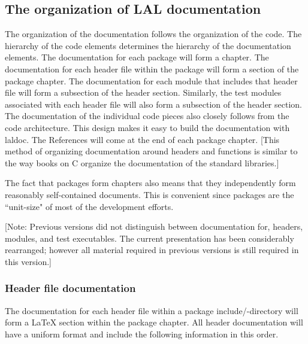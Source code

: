 \documentclass[]{ligodcc}
\begin{document}
\subsection{The organization of LAL documentation}
The organization  of  the documentation follows the organization of
the code. The hierarchy of the code elements determines the hierarchy
of the documentation elements. The documentation for each package will
form a chapter. The documentation for each  header file within the
package will form a section of the package chapter. The documentation
for each module that includes that header file will form a subsection
of the header section. Similarly, the test modules associated with
each header file will also form a subsection of the header section.
The  documentation of the individual code pieces also closely follows
from the code architecture.  This design makes it easy to build the
documentation with laldoc. The References will come at the end of each
package chapter. [This method of organizing documentation around
headers and functions is similar to  the way books on C organize the
documentation of  the standard libraries.]

The fact that packages form chapters also means that they
independently form reasonably self-contained documents.  This is
convenient since packages  are the ``unit-size" of  most of the
development efforts.

[Note: Previous versions did not distinguish between documentation
for, headers, modules, and test executables. The current presentation
has been considerably rearranged; however all material required in
previous versions is still required in this version.]

\subsubsection{Header file documentation}

The documentation for each header file within a package
include/-directory will form a LaTeX section within the package
chapter. All header  documentation will have a uniform format and
include the following information in this order.
\end{document}
